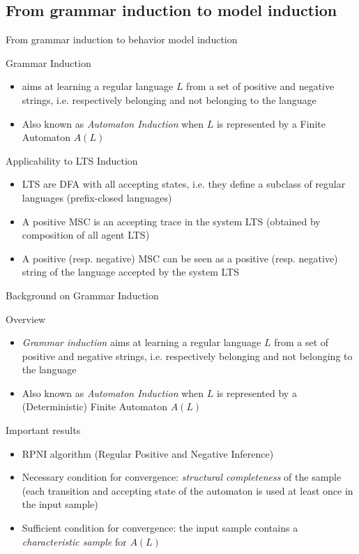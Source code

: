 \subsection{From grammar induction to model induction}
\begin{frame}{From grammar induction to behavior model induction}
  \begin{block}{Grammar Induction}
	  \begin{itemize}
	   	\item aims at learning a regular language $L$ from a set of positive and negative strings,
			      i.e. respectively belonging and not belonging to the language
		  \item Also known as \emph{Automaton Induction} when $L$ is represented by a Finite Automaton $A(L)$
	  \end{itemize}
  \end{block}
  \begin{block}{Applicability to LTS Induction}
	  \begin{itemize}
		  \item LTS are DFA with all accepting states, i.e. they define a subclass of regular 
            languages (prefix-closed languages)
		  \item A positive MSC is an accepting trace in the system LTS (obtained by composition of all agent LTS)
		  \item A positive (resp. negative) MSC can be seen as a positive (resp. negative) string of the language accepted 
            by the system LTS
	  \end{itemize}
  \end{block}
\end{frame}


\begin{frame}{Background on Grammar Induction}
  \begin{block}{Overview}
	  \begin{itemize}
	   	\item \emph{Grammar induction} aims at learning a regular language $L$ from a set of positive and negative strings,
			   i.e. respectively belonging and not belonging to the language
		  \item Also known as \emph{Automaton Induction} when $L$ is represented by a (Deterministic) Finite Automaton $A(L)$
	  \end{itemize}
  \end{block}
  \begin{block}{Important results}
	  \begin{itemize}
		  \item RPNI algorithm (Regular Positive and Negative Inference)
		  \item Necessary condition for convergence: \emph{structural completeness} of the sample (each transition and accepting state 
			  of the automaton is used at least once in the input sample)
		  \item Sufficient condition for convergence: the input sample contains a \emph{characteristic sample} for $A(L)$
	  \end{itemize}
  \end{block}
\end{frame}

